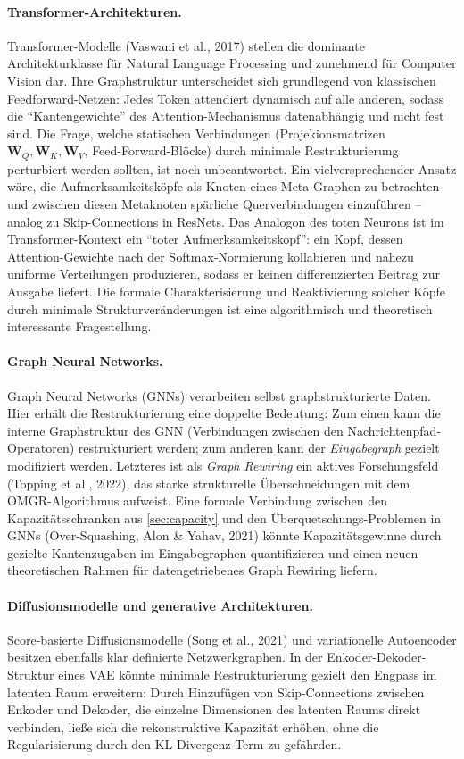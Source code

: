 ﻿\documentclass[12pt, a4paper, openany]{report}
\begin{document}
\paragraph{Transformer-Architekturen.}
Transformer-Modelle (Vaswani et al., 2017) stellen die dominante
Architekturklasse für Natural Language Processing und zunehmend für
Computer Vision dar.  Ihre Graphstruktur unterscheidet sich grundlegend
von klassischen Feedforward-Netzen: Jedes Token attendiert dynamisch
auf alle anderen, sodass die ``Kantengewichte'' des Attention-Mechanismus
datenabhängig und nicht fest sind.  Die Frage, welche statischen
Verbindungen (Projekionsmatrizen $\bm{W}_Q, \bm{W}_K, \bm{W}_V$,
Feed-Forward-Blöcke) durch minimale Restrukturierung perturbiert werden
sollten, ist noch unbeantwortet.  Ein vielversprechender Ansatz wäre,
die Aufmerksamkeitsköpfe als Knoten eines Meta-Graphen zu betrachten und
zwischen diesen Metaknoten spärliche Querverbindungen einzuführen --
analog zu Skip-Connections in ResNets.  Das Analogon des toten Neurons
ist im Transformer-Kontext ein ``toter Aufmerksamkeitskopf'': ein Kopf,
dessen Attention-Gewichte nach der Softmax-Normierung kollabieren und
nahezu uniforme Verteilungen produzieren, sodass er keinen
differenzierten Beitrag zur Ausgabe liefert.  Die formale
Charakterisierung und Reaktivierung solcher Köpfe durch minimale
Strukturveränderungen ist eine algorithmisch und theoretisch
interessante Fragestellung.

\paragraph{Graph Neural Networks.}
Graph Neural Networks (GNNs) verarbeiten selbst graphstrukturierte Daten.
Hier erhält die Restrukturierung eine doppelte Bedeutung: Zum einen kann
die interne Graphstruktur des GNN (Verbindungen zwischen den
Nachrichtenpfad-Operatoren) restrukturiert werden; zum anderen kann der
\emph{Eingabegraph} gezielt modifiziert werden.  Letzteres ist als
\emph{Graph Rewiring} ein aktives Forschungsfeld (Topping et al., 2022),
das starke strukturelle Überschneidungen mit dem OMGR-Algorithmus
aufweist.  Eine formale Verbindung zwischen den Kapazitätsschranken aus
\cref{sec:capacity} und den Überquetschungs-Problemen in GNNs (Over-Squashing,
Alon \& Yahav, 2021) könnte Kapazitätsgewinne durch gezielte Kantenzugaben
im Eingabegraphen quantifizieren und einen neuen theoretischen Rahmen für
datengetriebenes Graph Rewiring liefern.

\paragraph{Diffusionsmodelle und generative Architekturen.}
Score-basierte Diffusionsmodelle (Song et al., 2021) und variationelle
Autoencoder besitzen ebenfalls klar definierte Netzwerkgraphen.  In der
Enkoder-Dekoder-Struktur eines VAE könnte minimale Restrukturierung
gezielt den Engpass im latenten Raum erweitern: Durch Hinzufügen von
Skip-Connections zwischen Enkoder und Dekoder, die einzelne
Dimensionen des latenten Raums direkt verbinden, ließe sich die
rekonstruktive Kapazität erhöhen, ohne die Regularisierung durch den
KL-Divergenz-Term zu gefährden.
\end{document}
